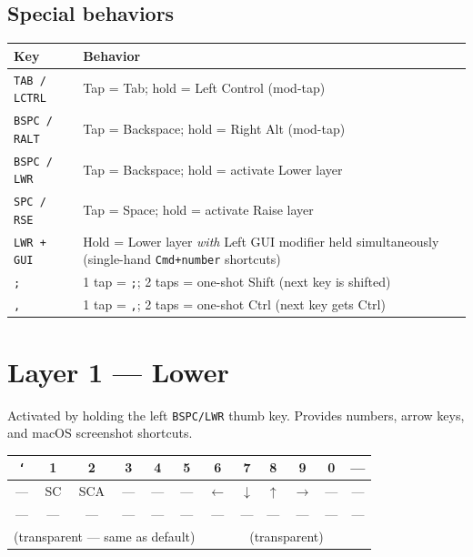 \documentclass[11pt, letterpaper]{article}
\begin{document}
\subsection*{Special behaviors}

\begin{tabular}{lp{9cm}}
\toprule
\textbf{Key} & \textbf{Behavior} \\
\midrule
\texttt{TAB / LCTRL}   & Tap = Tab; hold = Left Control (mod-tap) \\
\texttt{BSPC / RALT}   & Tap = Backspace; hold = Right Alt (mod-tap) \\
\texttt{BSPC / LWR}    & Tap = Backspace; hold = activate Lower layer \\
\texttt{SPC / RSE}     & Tap = Space; hold = activate Raise layer \\
\texttt{LWR + GUI}     & Hold = Lower layer \emph{with} Left GUI modifier held simultaneously (single-hand \texttt{Cmd+number} shortcuts) \\
\texttt{;}             & 1 tap = \texttt{;}; 2 taps = one-shot Shift (next key is shifted) \\
\texttt{,}             & 1 tap = \texttt{,}; 2 taps = one-shot Ctrl (next key gets Ctrl) \\
\bottomrule
\end{tabular}

\section{Layer 1 — Lower}

Activated by holding the left \texttt{BSPC/LWR} thumb key. Provides
numbers, arrow keys, and macOS screenshot shortcuts.

\begin{center}
\renewcommand{\arraystretch}{1.4}
\begin{tabular}{|c|c|c|c|c|c||c|c|c|c|c|c|}
\hline
\texttt{`} & 1 & 2 & 3 & 4 & 5 & 6 & 7 & 8 & 9 & 0 & --- \\
\hline
--- & SC & SCA & --- & --- & --- & $\leftarrow$ & $\downarrow$ & $\uparrow$ & $\rightarrow$ & --- & --- \\
\hline
--- & --- & --- & --- & --- & --- & --- & --- & --- & --- & --- & --- \\
\hline
\multicolumn{6}{|c|}{(transparent — same as default)} &
\multicolumn{6}{c|}{(transparent)} \\
\hline
\end{tabular}
\end{center}
\end{document}
